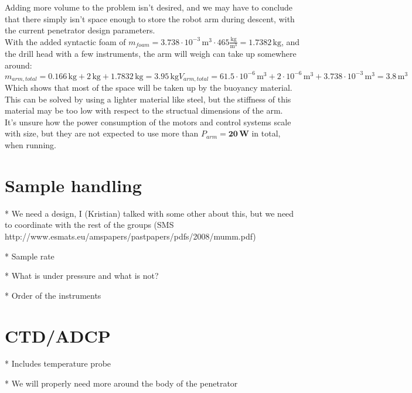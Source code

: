 Adding more volume to the problem isn't desired, and we may have to conclude that there simply isn't space enough to store the robot arm during descent, with the current penetrator design parameters.\\
With the added syntactic foam of $m_{foam}=3.738\cdot 10^{-3} \,\mathrm{m^3}\cdot 465\mathrm{\frac{kg}{m^3}}=1.7382\,\mathrm{kg}$, and the drill head with a few instruments, the arm will weigh can take up somewhere around:\
\begin{subequations}
\begin{equation}
m_{arm,total}=0.166\,\mathrm{kg}+2\,\mathrm{kg}+1.7832\,\mathrm{kg}=\mathbf{3.95\,\mathrm{kg}}
\end{equation}
\begin{equation}
V_{arm,total}=61.5\cdot 10^{-6}\,\mathrm{m^3}+2\cdot 10^{-6}\,\mathrm{m^3}+3.738\cdot 10^{-3}\,\mathrm{m^3}=\mathbf{3.8\,\mathrm{m^3}}
\end{equation}
\end{subequations}
Which shows that most of the space will be taken up by the buoyancy material. This can be solved by using a lighter material like steel, but the stiffness of this material may be too low with respect to the structual dimensions of the arm.\\
It's unsure how the power consumption of the motors and control systems scale with size, but they are not expected to use more than $P_{arm}=\mathbf{20\,W}$ in total, when running.


\section{Sample handling} 

* We need a design, I (Kristian) talked with some other about this, but we need to coordinate with the rest of the groups
   (SMS http://www.esmats.eu/amspapers/pastpapers/pdfs/2008/mumm.pdf)

* Sample rate

* What is under pressure and what is not?

* Order of the instruments




\section{CTD/ADCP}

* Includes temperature probe

    * We will properly need more around the body of the penetrator

